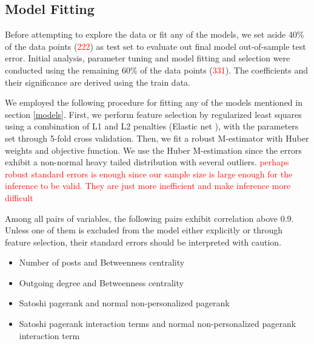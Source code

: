 \subsection{Model Fitting}
Before attempting to explore the data or fit any of the models, we set aside 40\% of the data points (\textcolor{red}{222}) as test set to evaluate out final model out-of-sample test error. Initial analysis, parameter tuning and model fitting and selection were conducted using the remaining 60\% of the data points (\textcolor{red}{331}). The coefficients and their significance are derived using the train data.

We employed the following procedure for fitting any of the models mentioned in section \ref{models}. First, we perform feature selection by regularized least squares using a combination of L1 and L2 penalties (Elastic net \cite{ElasticNet}), with the parameters set through 5-fold cross validation. Then, we fit a robust M-estimator with Huber weights and objective function. We use the Huber M-estimation since the errors exhibit a non-normal heavy tailed distribution with several outliers. \textcolor{red}{perhaps robust standard errors is enough since our sample size is large enough for the inference to be valid. They are just more inefficient and make inference more difficult}

Among all pairs of variables, the following pairs exhibit correlation above 0.9. Unless one of them is excluded from the model either explicitly or through feature selection, their standard errors should be interpreted with caution.
\begin{itemize} [topsep=0pt,itemsep=-0.5ex,partopsep=1ex,parsep=1ex]
 \item Number of posts and Betweenness centrality
 \item Outgoing degree and Betweenness centrality
 \item Satoshi pagerank and normal non-personalized pagerank
 \item Satoshi pagerank interaction terms and normal non-personalized pagerank interaction term
\end{itemize}





